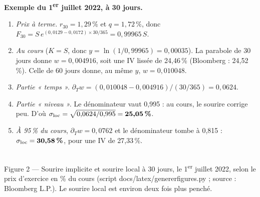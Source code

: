 \documentclass[10pt,a4paper]{article}
\newcommand{\coupure}{\textunderscore\allowbreak}
\newcommand{\fic}[1]{{\small\ttfamily\let\_\coupure #1}}
\begin{document}
\textbf{Exemple du 1\textsuperscript{er} juillet 2022, à 30 jours.}
\begin{enumerate}[nosep,leftmargin=*]
  \item \emph{Prix à terme.} $r_{30}=1{,}29\,\%$ et $q=1{,}72\,\%$, donc $F_{30}=S\,e^{(0{,}0129-0{,}0172)\times30/365}=0{,}99965\,S$.
  \item \emph{Au cours} ($K=S$, donc $y=\ln(1/0{,}99965)=0{,}00035$). La parabole de 30 jours donne $w=0{,}004916$, soit une IV lissée de 24,46\,\% (Bloomberg : 24,52\,\%). Celle de 60 jours donne, au même $y$, $w=0{,}010048$.
  \item \emph{Partie « temps ».} $\partial_T w=(0{,}010048-0{,}004916)/(30/365)=0{,}0624$.
  \item \emph{Partie « niveau ».} Le dénominateur vaut 0,995 : au cours, le sourire corrige peu. D'où $\sigma_{\mathrm{loc}}=\sqrt{0{,}0624/0{,}995}=\textbf{25,05\,\%}$.
  \item \emph{À 95\,\% du cours}, $\partial_T w=0{,}0762$ et le dénominateur tombe à 0,815 : $\sigma_{\mathrm{loc}}=\textbf{30,58\,\%}$, pour une IV de 27,33\,\%.
\end{enumerate}

\begin{center}
\\[-2pt]
{\footnotesize\color{discret}Figure 2 — Sourire implicite et sourire local à 30 jours, le 1\textsuperscript{er} juillet 2022, selon le prix d'exercice en \% du cours (script \fic{docs/latex/generer\_figures.py} ; source : Bloomberg L.P.). Le sourire local est environ deux fois plus penché.}
\end{center}
\end{document}
